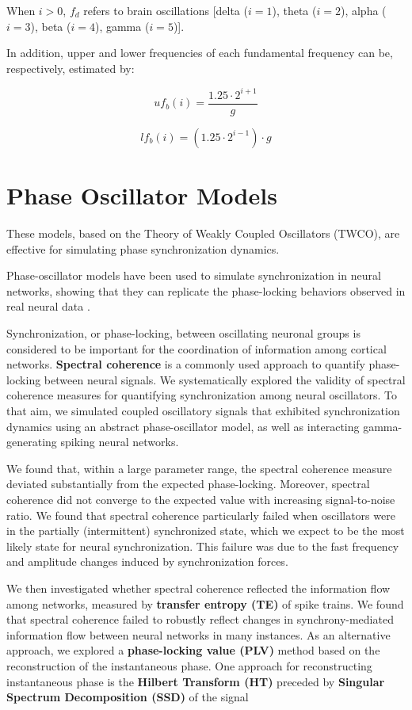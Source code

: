 \documentclass{article}
\begin{document}
When $i > 0$, $f_d$ refers to brain oscillations [delta ($i = 1$), theta ($i = 2$), alpha ($i = 3$), beta ($i = 4$), gamma ($i = 5$)].

In addition, upper and lower frequencies of each fundamental frequency can be, respectively, estimated by:

\[
uf_b(i) = \frac{1.25 \cdot 2^{i+1}}{g}
\]

\[
lf_b(i) = (1.25 \cdot 2^{i-1}) \cdot g
\]
\section{Phase Oscillator Models}

These models, based on the Theory of Weakly Coupled Oscillators (TWCO), are effective for simulating phase synchronization dynamics. 

Phase-oscillator models have been used to simulate synchronization in neural networks, showing that they can replicate the phase-locking behaviors observed in real neural data \citep{lowet2016}.

Synchronization, or phase-locking, between oscillating neuronal groups is considered to be important for the coordination of information among cortical networks. \textbf{Spectral coherence} is a commonly used approach to quantify phase-locking between neural signals. We systematically explored the validity of spectral coherence measures for quantifying synchronization among neural oscillators. To that aim, we simulated coupled oscillatory signals that exhibited synchronization dynamics using an abstract phase-oscillator model, as well as interacting gamma-generating spiking neural networks. 

We found that, within a large parameter range, the spectral coherence measure deviated substantially from the expected phase-locking. Moreover, spectral coherence did not converge to the expected value with increasing signal-to-noise ratio. We found that spectral coherence particularly failed when oscillators were in the partially (intermittent) synchronized state, which we expect to be the most likely state for neural synchronization. This failure was due to the fast frequency and amplitude changes induced by synchronization forces.

We then investigated whether spectral coherence reflected the information flow among networks, measured by \textbf{transfer entropy (TE)} of spike trains. We found that spectral coherence failed to robustly reflect changes in synchrony-mediated information flow between neural networks in many instances. As an alternative approach, we explored a \textbf{phase-locking value (PLV)} method based on the reconstruction of the instantaneous phase. One approach for reconstructing instantaneous phase is the \textbf{Hilbert Transform (HT)} preceded by \textbf{Singular Spectrum Decomposition (SSD)} of the signal
\end{document}
